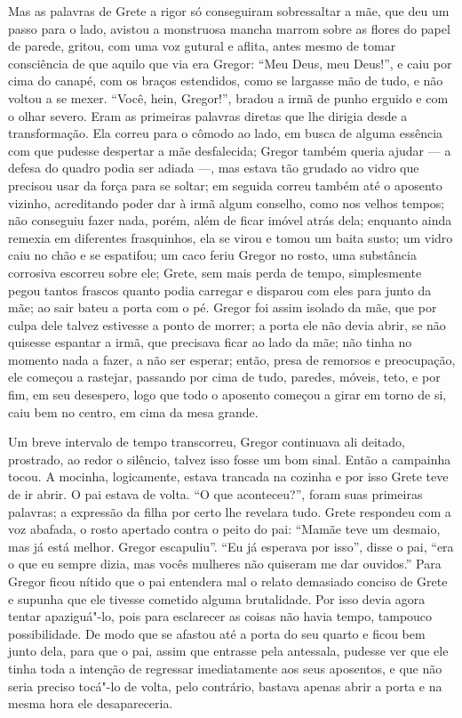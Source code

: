 Mas as palavras de Grete a rigor só conseguiram sobressaltar a mãe, que
deu um passo para o lado, avistou a monstruosa mancha marrom sobre as
flores do papel de parede, gritou, com uma voz gutural e aflita, antes
mesmo de tomar consciência de que aquilo que via era Gregor: “Meu Deus,
meu Deus!”, e caiu por cima do canapé, com os braços estendidos, como se
largasse mão de tudo, e não voltou a se mexer. “Você, hein, Gregor!”,
bradou a irmã de punho erguido e com o olhar severo. Eram as primeiras
palavras diretas que lhe dirigia desde a transformação. Ela correu para o
cômodo ao lado, em busca de alguma essência com que pudesse despertar a
mãe desfalecida; Gregor também queria ajudar --- a defesa do quadro podia
ser adiada ---, mas estava tão grudado ao vidro que precisou usar da força
para se soltar; em seguida correu também até o aposento vizinho,
acreditando poder dar à irmã algum conselho, como nos velhos tempos; não
conseguiu fazer nada, porém, além de ficar imóvel atrás dela; enquanto
ainda remexia em diferentes frasquinhos, ela se virou e tomou um baita
susto; um vidro caiu no chão e se espatifou; um caco feriu Gregor no
rosto, uma substância corrosiva escorreu sobre ele; Grete, sem mais perda
de tempo, simplesmente pegou tantos frascos quanto podia carregar e
disparou com eles para junto da mãe; ao sair bateu a porta com o pé.
Gregor foi assim isolado da mãe, que por culpa dele talvez estivesse a
ponto de morrer; a porta ele não devia abrir, se não quisesse espantar a
irmã, que precisava ficar ao lado da mãe; não tinha no momento nada a
fazer, a não ser esperar; então, presa de remorsos e preocupação, ele
começou a rastejar, passando por cima de tudo, paredes, móveis, teto, e
por fim, em seu desespero, logo que todo o aposento começou a girar em
torno de si, caiu bem no centro, em cima da mesa grande.

Um breve intervalo de tempo transcorreu, Gregor continuava ali deitado,
prostrado, ao redor o silêncio, talvez isso fosse um bom sinal. Então a
campainha tocou. A mocinha, logicamente, estava trancada na cozinha e por
isso Grete teve de ir abrir. O pai estava de volta. “O que aconteceu?”,
foram suas primeiras palavras; a expressão da filha por certo lhe revelara
tudo. Grete respondeu com a voz abafada, o rosto apertado contra o peito
do pai: “Mamãe teve um desmaio, mas já está melhor. Gregor escapuliu”. “Eu
já esperava por isso”, disse o pai, “era o que eu sempre dizia, mas vocês
mulheres não quiseram me dar ouvidos.” Para Gregor ficou nítido que o pai
entendera mal o relato demasiado conciso de Grete e supunha que ele
tivesse cometido alguma brutalidade. Por isso devia agora tentar
apaziguá"-lo, pois para esclarecer as coisas não havia tempo, tampouco
possibilidade. De modo que se afastou até a porta do seu quarto e ficou
bem junto dela, para que o pai, assim que entrasse pela antessala, pudesse
ver que ele tinha toda a intenção de regressar imediatamente aos seus
aposentos, e que não seria preciso tocá"-lo de volta, pelo contrário,
bastava apenas abrir a porta e na mesma hora ele desapareceria.

